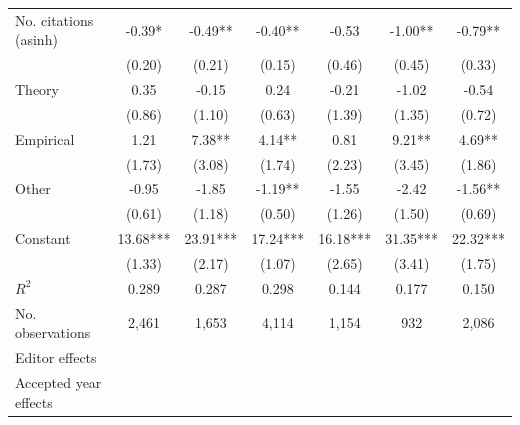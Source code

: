 \begin{table}
\begin{threeparttable}
\begin{tabular}{p{3.78cm}S@{}S@{}S@{}S@{}S@{}S@{}}
            No. citations (asinh)         &       -0.39*  &       -0.49** &       -0.40** &       -0.53   &       -1.00** &       -0.79** \\
                                          &      (0.20)   &      (0.21)   &      (0.15)   &      (0.46)   &      (0.45)   &      (0.33)   \\
            Theory                        &        0.35   &       -0.15   &        0.24   &       -0.21   &       -1.02   &       -0.54   \\
                                          &      (0.86)   &      (1.10)   &      (0.63)   &      (1.39)   &      (1.35)   &      (0.72)   \\
            Empirical                     &        1.21   &        7.38** &        4.14** &        0.81   &        9.21** &        4.69** \\
                                          &      (1.73)   &      (3.08)   &      (1.74)   &      (2.23)   &      (3.45)   &      (1.86)   \\
            Other                         &       -0.95   &       -1.85   &       -1.19** &       -1.55   &       -2.42   &       -1.56** \\
                                          &      (0.61)   &      (1.18)   &      (0.50)   &      (1.26)   &      (1.50)   &      (0.69)   \\
            Constant                      &       13.68***&       23.91***&       17.24***&       16.18***&       31.35***&       22.32***\\
                                          &      (1.33)   &      (2.17)   &      (1.07)   &      (2.65)   &      (3.41)   &      (1.75)   \\
            \midrule
            \(R^2\)                       &       0.289   &       0.287   &       0.298   &       0.144   &       0.177   &       0.150   \\
            No. observations              &       2,461   &       1,653   &       4,114   &       1,154   &         932   &       2,086   \\
            \midrule
            Editor effects        &           {}   &           {}   &           {}   &           {}   &           {}   &           {}   \\
            Accepted year effects         &           {}   &           {}   &               &           {}   &           {}   &               \\

\end{tabular}
\end{threeparttable}
\end{table}
